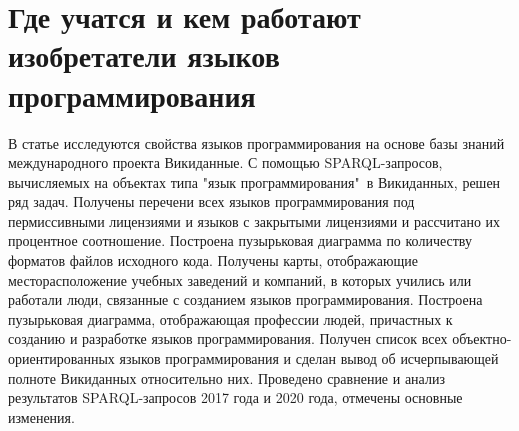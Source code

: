 \chapter{Где учатся и кем работают изобретатели языков программирования}
\label{ch:programming languages}



В статье исследуются свойства языков программирования на основе базы знаний международного проекта Викиданные. С помощью SPARQL-запросов, вычисляемых на объектах типа "язык программирования"\  в Викиданных, решен ряд задач. Получены перечени всех языков программирования под пермиссивными лицензиями и языков с закрытыми лицензиями и рассчитано их процентное соотношение. Построена пузырьковая диаграмма по количеству форматов файлов исходного кода. Получены карты, отображающие месторасположение учебных заведений и компаний, в которых учились или работали люди, связанные с созданием языков программирования. Построена пузырьковая диаграмма, отображающая профессии людей, причастных к созданию и разработке языков программирования. Получен список всех объектно-ориентированных языков программирования и сделан вывод об исчерпывающей полноте Викиданных относительно них. Проведено сравнение и анализ результатов SPARQL-запросов 2017 года и 2020 года, отмечены основные изменения. 

